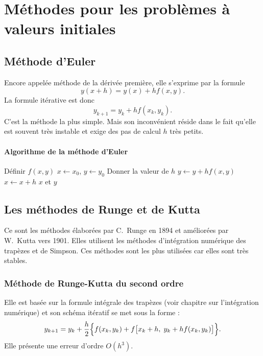 \section{Méthodes pour les problèmes à valeurs initiales}

\subsection{Méthode d'Euler}

Encore appelée méthode de la dérivée première, elle s'exprime par la formule
\[
  y(x+h) = y(x) + hf(x, y) .
\]
La formule itérative est donc
\[
  y_{k+1} = y_k + hf(x_k, y_k) .
\]
C'est la méthode la plus simple. Mais son inconvénient réside dans le fait
qu'elle est souvent très instable et exige des pas de calcul $h$ très petits.

\paragraph{Algorithme de la méthode d'Euler}

\begin{algo}
  \State Définir $f(x,y)$
  \State $x \leftarrow x_0$, $y \leftarrow y_0$
  \State Donner la valeur de $h$
    \State $y \leftarrow y + hf(x,y)$
    \State $x \leftarrow x + h$
    \Print $x$ et $y$
  \EndFor
\end{algo}

\subsection{Les méthodes de Runge et de Kutta}

Ce sont les méthodes élaborées par C.~Runge en 1894 et améliorées par
W.~Kutta vers 1901. Elles utilisent les méthodes d'intégration numérique des
trapèzes et de Simpson. Ces méthodes sont les plus utilisées car elles sont
très stables.

\subsubsection{Méthode de Runge-Kutta du second ordre}

Elle est basée sur la formule intégrale des trapèzes (voir chapitre sur
l'intégration numérique) et son schéma itératif se met sous la forme :
\[
  y_{k+1} = y_k + \frac{h}{2}\Bigl\{f(x_k, y_k) + f\bigl[x_k + h,\; y_k + hf(x_k, y_k)\bigr]\Bigr\} .
\]
Elle présente une erreur d'ordre $O(h^3)$.

